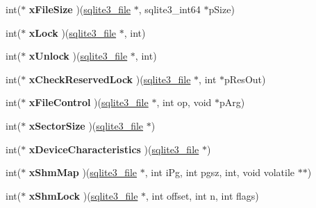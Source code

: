 \begin{DoxyCompactItemize}
int($\ast$ {\bfseries x\+File\+Size} )(\hyperlink{structsqlite3__file}{sqlite3\+\_\+file} $\ast$, sqlite3\+\_\+int64 $\ast$p\+Size)
\item 
\mbox{\label{structsqlite3__io__methods_a3e4749687788b89ed0f672db7a4f6ac8}} 
int($\ast$ {\bfseries x\+Lock} )(\hyperlink{structsqlite3__file}{sqlite3\+\_\+file} $\ast$, int)
\item 
\mbox{\label{structsqlite3__io__methods_ac90eeb9153eb6608a1872760660e718f}} 
int($\ast$ {\bfseries x\+Unlock} )(\hyperlink{structsqlite3__file}{sqlite3\+\_\+file} $\ast$, int)
\item 
\mbox{\label{structsqlite3__io__methods_a97f5eb0c2dc7e1cf2f8ecd6857e4c77c}} 
int($\ast$ {\bfseries x\+Check\+Reserved\+Lock} )(\hyperlink{structsqlite3__file}{sqlite3\+\_\+file} $\ast$, int $\ast$p\+Res\+Out)
\item 
\mbox{\label{structsqlite3__io__methods_a5d2a5ba7937b4a6c6c5ba62c4e2b9166}} 
int($\ast$ {\bfseries x\+File\+Control} )(\hyperlink{structsqlite3__file}{sqlite3\+\_\+file} $\ast$, int op, void $\ast$p\+Arg)
\item 
\mbox{\label{structsqlite3__io__methods_a8436e6eeac404b35057be97f3c2b5c3d}} 
int($\ast$ {\bfseries x\+Sector\+Size} )(\hyperlink{structsqlite3__file}{sqlite3\+\_\+file} $\ast$)
\item 
\mbox{\label{structsqlite3__io__methods_ace5e9e9f267c6c57023109c0658f2683}} 
int($\ast$ {\bfseries x\+Device\+Characteristics} )(\hyperlink{structsqlite3__file}{sqlite3\+\_\+file} $\ast$)
\item 
\mbox{\label{structsqlite3__io__methods_a42d21006b7f01acb258986f2c090c64d}} 
int($\ast$ {\bfseries x\+Shm\+Map} )(\hyperlink{structsqlite3__file}{sqlite3\+\_\+file} $\ast$, int i\+Pg, int pgsz, int, void volatile $\ast$$\ast$)
\item 
\mbox{\label{structsqlite3__io__methods_a58f4a6b0df86440029cc5fa1b65b1b4e}} 
int($\ast$ {\bfseries x\+Shm\+Lock} )(\hyperlink{structsqlite3__file}{sqlite3\+\_\+file} $\ast$, int offset, int n, int flags)
$$
\end{DoxyCompactItemize}
